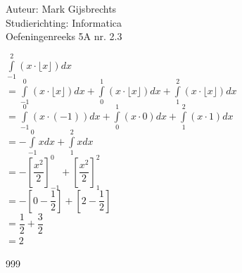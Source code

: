 \documentclass[a4paper]{article}
\newcommand{\dint}{\displaystyle\int}
\begin{document}
\noindent \large Auteur: Mark Gijsbrechts \\
\noindent \large Studierichting: Informatica\\
\noindent \large Oefeningenreeks 5A nr. 2.3\\

\medskip

\normalsize





$ \dint\limits_{-1}^{2}\left(x \cdot \lfloor x \rfloor \right)dx $ \\

$= \dint\limits_{-1}^{0}\left(x \cdot \lfloor x \rfloor \right)dx + \dint\limits_{0}^{1}\left(x \cdot \lfloor x \rfloor\right)dx + \dint\limits_{1}^{2}\left(x \cdot \lfloor x \rfloor \right)dx  $ \\

$= \dint\limits_{-1}^{0}\left(x \cdot \left(-1\right) \right)dx + \dint\limits_{0}^{1}\left(x \cdot 0 \right)dx + \dint\limits_{1}^{2}\left(x \cdot 1 \right)dx  $ \\

$= -\dint\limits_{-1}^{0}x dx + \dint\limits_{1}^{2}x dx $ \\

$= -\left[\dfrac{x^2}{2}\right]_{-1}^{0} + \left[\dfrac{x^2}{2}\right]_{1}^{2} $ \\

$= -\left[ 0 - \dfrac{1}{2} \right] + \left[ 2 - \dfrac{1}{2} \right] $ \\

$= \dfrac{1}{2} + \dfrac{3}{2} $ \\

$= 2 $ \\



\begin{thebibliography}{999}
\end{thebibliography}
\end{document}
